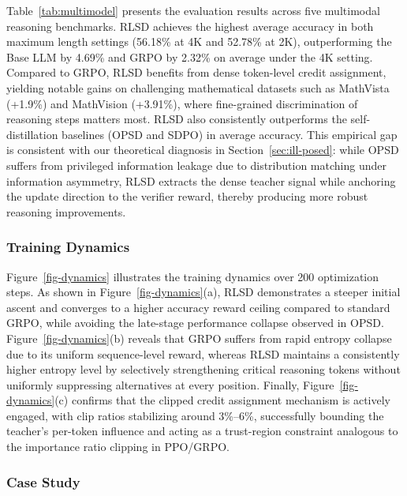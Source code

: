 \documentclass[]{jingdong}
\begin{document}
Table~\ref{tab:multimodel} presents the evaluation results across five multimodal reasoning benchmarks. RLSD achieves the highest average accuracy in both maximum length settings (56.18\% at 4K and 52.78\% at 2K), outperforming the Base LLM by 4.69\% and GRPO by 2.32\% on average under the 4K setting. Compared to GRPO, RLSD benefits from dense token-level credit assignment, yielding notable gains on challenging mathematical datasets such as MathVista (+1.9\%) and MathVision (+3.91\%), where fine-grained discrimination of reasoning steps matters most. RLSD also consistently outperforms the self-distillation baselines (OPSD and SDPO) in average accuracy. This empirical gap is consistent with our theoretical diagnosis in Section~\ref{sec:ill-posed}: while OPSD suffers from privileged information leakage due to distribution matching under information asymmetry, RLSD extracts the dense teacher signal while anchoring the update direction to the verifier reward, thereby producing more robust reasoning improvements.

\subsubsection{Training Dynamics}
\label{sec:training-dynamics}



Figure~\ref{fig-dynamics} illustrates the training dynamics over 200 optimization steps. As shown in Figure~\ref{fig-dynamics}(a), RLSD demonstrates a steeper initial ascent and converges to a higher accuracy reward ceiling compared to standard GRPO, while avoiding the late-stage performance collapse observed in OPSD. Figure~\ref{fig-dynamics}(b) reveals that GRPO suffers from rapid entropy collapse due to its uniform sequence-level reward, whereas RLSD maintains a consistently higher entropy level by selectively strengthening critical reasoning tokens without uniformly suppressing alternatives at every position. Finally, Figure~\ref{fig-dynamics}(c) confirms that the clipped credit assignment mechanism is actively engaged, with clip ratios stabilizing around 3\%--6\%, successfully bounding the teacher's per-token influence and acting as a trust-region constraint analogous to the importance ratio clipping in PPO/GRPO.

\subsubsection{Case Study}
\label{sec:case-study}

\end{document}
